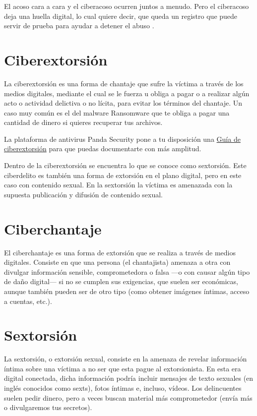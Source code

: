 \documentclass[
  a4paper,
  openany]{book}
\begin{document}
El acoso cara a cara y el ciberacoso ocurren juntos a menudo. Pero el ciberacoso deja una huella digital, lo cual quiere decir, que queda un registro que puede servir de prueba para ayudar a detener el abuso \citep{ciberacoso}.

\hypertarget{ciberextorsiuxf3n}{%
\section{Ciberextorsión}\label{ciberextorsiuxf3n}}

La ciberextorsión es una forma de chantaje que sufre la víctima a través de los medios digitales, mediante el cual se le fuerza u obliga a pagar o a realizar algún acto o actividad delictiva o no lícita, para evitar los términos del chantaje. Un caso muy común es el del malware Ransomware que te obliga a pagar una cantidad de dinero si quieres recuperar tus archivos.

La plataforma de antivirus Panda Security pone a tu disposición una \href{https://www.pandasecurity.com/es/mediacenter/src/uploads/2016/02/Guia_Ciberextorsion-es.pdf}{Guía de ciberextorsión} para que puedas documentarte con más amplitud.

Dentro de la ciberextorsión se encuentra lo que se conoce como sextorsión. Este ciberdelito es también una forma de extorsión en el plano digital, pero en este caso con contenido sexual. En la sextorsión la víctima es amenazada con la supuesta publicación y difusión de contenido sexual.

\hypertarget{ciberchantaje}{%
\section{Ciberchantaje}\label{ciberchantaje}}

El ciberchantaje es una forma de extorsión que se realiza a través de medios digitales. Consiste en que una persona (el chantajista) amenaza a otra con divulgar información sensible, comprometedora o falsa ---o con causar algún tipo de daño digital--- si no se cumplen sus exigencias, que suelen ser económicas, aunque también pueden ser de otro tipo (como obtener imágenes íntimas, acceso a cuentas, etc.).

\hypertarget{sextorsiuxf3n}{%
\section{Sextorsión}\label{sextorsiuxf3n}}

La sextorsión, o extorsión sexual, consiste en la amenaza de revelar información íntima sobre una víctima a no ser que esta pague al extorsionista. En esta era digital conectada, dicha información podría incluir mensajes de texto sexuales (en inglés conocidos como sexts), fotos íntimas e, incluso, vídeos. Los delincuentes suelen pedir dinero, pero a veces buscan material más comprometedor (envía más o divulgaremos tus secretos)\citep{KASPER-sextorsión}.
\end{document}
